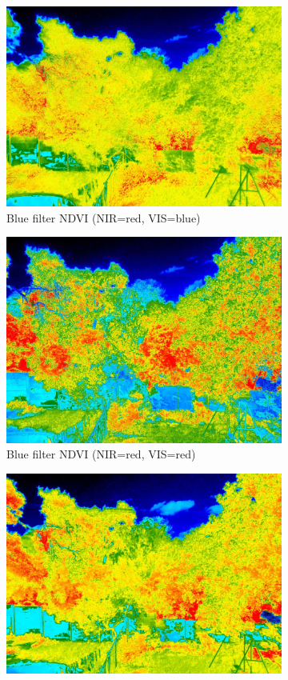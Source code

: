 \begin{appendices}
\begin{figure}[H]
\begin{subfigure}{0.5\textwidth}
\includegraphics[scale=0.17]{filter/blue_Color_Index.jpg}
\caption{Blue filter NDVI (NIR=red, VIS=blue)}
\end{subfigure}
\begin{subfigure}{0.5\textwidth}
\centering
\includegraphics[scale=0.17]{filter/blue_d_ndvi.jpg}
\caption{Blue filter NDVI (NIR=red, VIS=red)}
\end{subfigure}
\begin{subfigure}{0.5\textwidth}
\centering
\includegraphics[scale=0.17]{filter/green_Color_Index.jpg}

\end{subfigure}
\end{figure}
\end{appendices}
